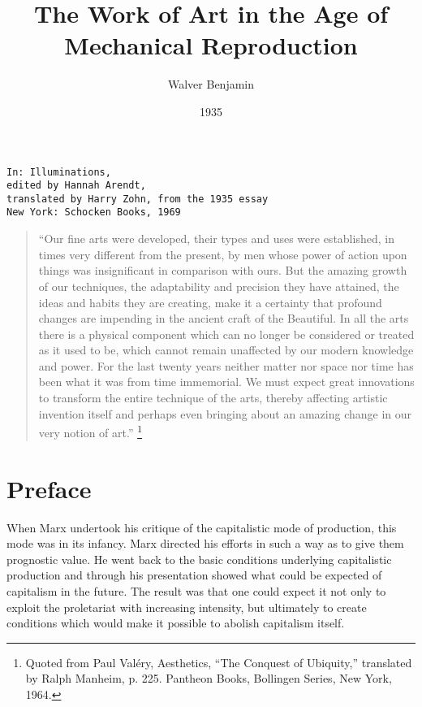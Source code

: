 \documentclass{article}
\title{The Work of Art in the Age of Mechanical Reproduction}
\author{Walver Benjamin}
\date{1935}
\begin{document}
\maketitle

\begin{verbatim}
In: Illuminations,
edited by Hannah Arendt,
translated by Harry Zohn, from the 1935 essay
New York: Schocken Books, 1969
\end{verbatim}

\begin{quote}
``Our fine arts were developed, their types and uses were established, in times
very different from the present, by men whose power of action upon things was
insignificant in comparison with ours. But the amazing growth of our
techniques, the adaptability and precision they have attained, the ideas and
habits they are creating, make it a certainty that profound changes are
impending in the ancient craft of the Beautiful. In all the arts there is a
physical component which can no longer be considered or treated as it used to
be, which cannot remain unaffected by our modern knowledge and power. For
the last twenty years neither matter nor space nor time has been what it was
from time immemorial. We must expect great innovations to transform the
entire technique of the arts, thereby affecting artistic invention itself and
perhaps even bringing about an amazing change in our very notion of art.''
\footnote{
	Quoted from Paul Valéry, Aesthetics, “The Conquest of Ubiquity,” translated by Ralph
Manheim, p. 225. Pantheon Books, Bollingen Series, New York, 1964.}
\end{quote}


\section*{Preface}

When Marx undertook his critique of the capitalistic mode of production, this
mode was in its infancy. Marx directed his efforts in such a way as to give
them prognostic value. He went back to the basic conditions underlying
capitalistic production and through his presentation showed what could be
expected of capitalism in the future. The result was that one could expect it
not only to exploit the proletariat with increasing intensity, but ultimately
to create conditions which would make it possible to abolish capitalism itself.
\end{document}
